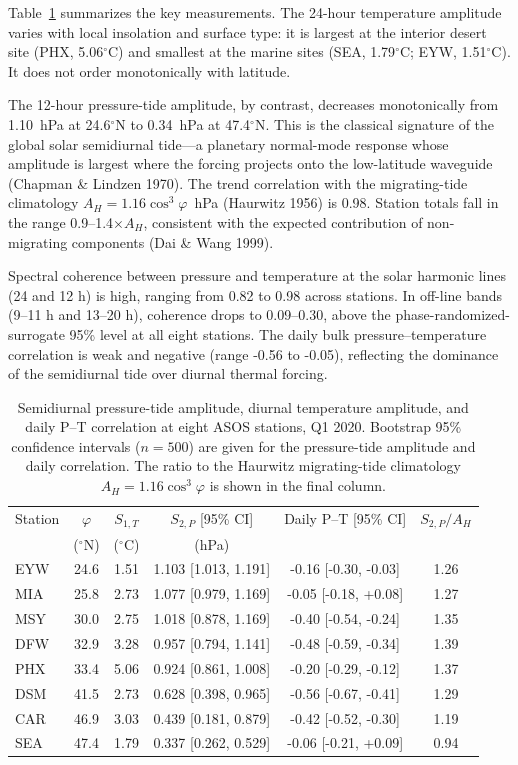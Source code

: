 \documentclass[aps,prfluids,preprint,superscriptaddress,nofootinbib]{revtex4-2}
\begin{document}
Table~\ref{tab:asos} summarizes the key measurements. The 24-hour temperature amplitude varies with local insolation and surface type: it is largest at the interior desert site (PHX, 5.06$^\circ$C) and smallest at the marine sites (SEA, 1.79$^\circ$C; EYW, 1.51$^\circ$C). It does not order monotonically with latitude.

The 12-hour pressure-tide amplitude, by contrast, decreases monotonically from 1.10~hPa at 24.6$^\circ$N to 0.34~hPa at 47.4$^\circ$N. This is the classical signature of the global solar semidiurnal tide---a planetary normal-mode response whose amplitude is largest where the forcing projects onto the low-latitude waveguide (Chapman \& Lindzen 1970). The trend correlation with the migrating-tide climatology $A_H = 1.16\cos^3\varphi$~hPa (Haurwitz 1956) is 0.98. Station totals fall in the range 0.9--1.4$\times A_H$, consistent with the expected contribution of non-migrating components (Dai \& Wang 1999).

Spectral coherence between pressure and temperature at the solar harmonic lines (24 and 12 h) is high, ranging from 0.82 to 0.98 across stations. In off-line bands (9--11 h and 13--20 h), coherence drops to 0.09--0.30, above the phase-randomized-surrogate 95\% level at all eight stations. The daily bulk pressure--temperature correlation is weak and negative (range -0.56 to -0.05), reflecting the dominance of the semidiurnal tide over diurnal thermal forcing.

\begin{table}[t]
\centering
\caption{Semidiurnal pressure-tide amplitude, diurnal temperature amplitude, and daily P--T correlation at eight ASOS stations, Q1 2020. Bootstrap 95\% confidence intervals ($n=500$) are given for the pressure-tide amplitude and daily correlation. The ratio to the Haurwitz migrating-tide climatology $A_H = 1.16\cos^3\varphi$ is shown in the final column.}
\label{tab:asos}
\begin{tabular}{lccccc}
\toprule
Station & $\varphi$ & $S_{1,T}$ & $S_{2,P}$ [95\% CI] &
Daily P--T [95\% CI] & $S_{2,P}/A_H$ \\
 & ($^\circ$N) & ($^\circ$C) & (hPa) & & \\
\midrule
EYW & 24.6 & 1.51 & 1.103 [1.013, 1.191] & -0.16 [-0.30, -0.03] & 1.26 \\
MIA & 25.8 & 2.73 & 1.077 [0.979, 1.169] & -0.05 [-0.18, +0.08] & 1.27 \\
MSY & 30.0 & 2.75 & 1.018 [0.878, 1.169] & -0.40 [-0.54, -0.24] & 1.35 \\
DFW & 32.9 & 3.28 & 0.957 [0.794, 1.141] & -0.48 [-0.59, -0.34] & 1.39 \\
PHX & 33.4 & 5.06 & 0.924 [0.861, 1.008] & -0.20 [-0.29, -0.12] & 1.37 \\
DSM & 41.5 & 2.73 & 0.628 [0.398, 0.965] & -0.56 [-0.67, -0.41] & 1.29 \\
CAR & 46.9 & 3.03 & 0.439 [0.181, 0.879] & -0.42 [-0.52, -0.30] & 1.19 \\
SEA & 47.4 & 1.79 & 0.337 [0.262, 0.529] & -0.06 [-0.21, +0.09] & 0.94 \\
\bottomrule
\end{tabular}
\end{table}
\end{document}
